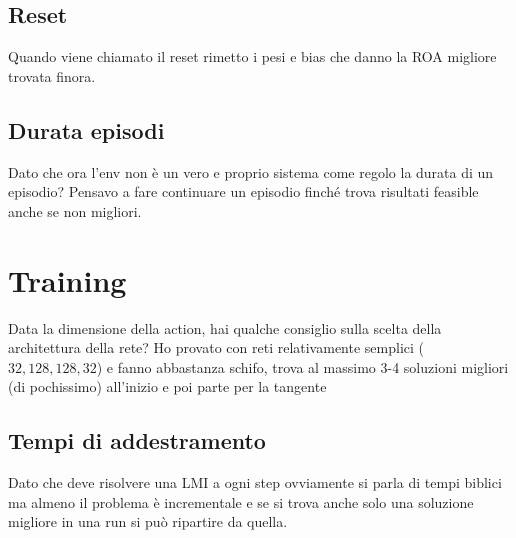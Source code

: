 \documentclass{article}
\begin{document}
\subsection*{Reset}
Quando viene chiamato il reset rimetto i pesi e bias che danno la ROA migliore trovata finora.\\

\subsection*{Durata episodi}
Dato che ora l'env non è un vero e proprio sistema come regolo la durata di un episodio? Pensavo a fare continuare un episodio finché trova risultati feasible anche se non migliori.


\section*{Training}
Data la dimensione della action, hai qualche consiglio sulla scelta della architettura della rete? Ho provato con reti relativamente semplici ($32, 128, 128, 32$) e fanno abbastanza schifo, trova al massimo 3-4 soluzioni migliori (di pochissimo) all'inizio e poi parte per la tangente

\subsection*{Tempi di addestramento}
Dato che deve risolvere una LMI a ogni step ovviamente si parla di tempi biblici ma almeno il problema è incrementale e se si trova anche solo una soluzione migliore in una run si può ripartire da quella.
\end{document}
